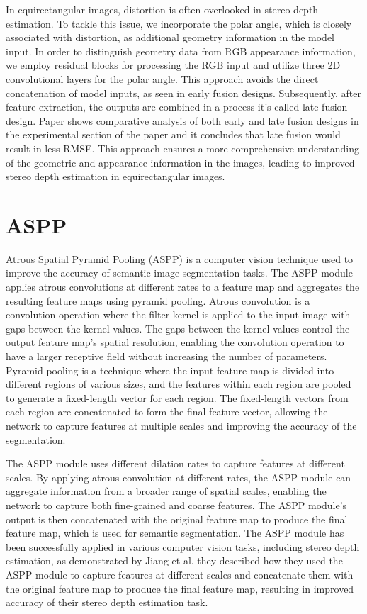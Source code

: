 \documentclass[english, LaM, oneside]{sapthesis}%
\begin{document}
In equirectangular images, distortion is often overlooked in stereo depth estimation. To tackle this issue, we incorporate the polar angle, which is closely associated with distortion, as additional geometry information in the model input. In order to distinguish geometry data from RGB appearance information, we employ residual blocks for processing the RGB input and utilize three 2D convolutional layers for the polar angle. This approach avoids the direct concatenation of model inputs, as seen in early fusion designs. Subsequently, after feature extraction, the outputs are combined in a process it's called late fusion design. Paper\cite{c20} shows comparative analysis of both early and late fusion designs in the experimental section of the paper and it concludes that late fusion would result in less RMSE. This approach ensures a more comprehensive understanding of the geometric and appearance information in the images, leading to improved stereo depth estimation in equirectangular images.

\section{ASPP}

Atrous Spatial Pyramid Pooling (ASPP)\cite{aspp} is a computer vision technique used to improve the accuracy of semantic image segmentation tasks. The ASPP module applies atrous convolutions at different rates to a feature map and aggregates the resulting feature maps using pyramid pooling. Atrous convolution is a convolution operation where the filter kernel is applied to the input image with gaps between the kernel values. The gaps between the kernel values control the output feature map's spatial resolution, enabling the convolution operation to have a larger receptive field without increasing the number of parameters. Pyramid pooling is a technique where the input feature map is divided into different regions of various sizes, and the features within each region are pooled to generate a fixed-length vector for each region. The fixed-length vectors from each region are concatenated to form the final feature vector, allowing the network to capture features at multiple scales and improving the accuracy of the segmentation.

The ASPP module uses different dilation rates to capture features at different scales. By applying atrous convolution at different rates, the ASPP module can aggregate information from a broader range of spatial scales, enabling the network to capture both fine-grained and coarse features. The ASPP module's output is then concatenated with the original feature map to produce the final feature map, which is used for semantic segmentation. The ASPP module has been successfully applied in various computer vision tasks, including stereo depth estimation, as demonstrated by Jiang et al. they described how they used the ASPP module to capture features at different scales and concatenate them with the original feature map to produce the final feature map, resulting in improved accuracy of their stereo depth estimation task.
\end{document}

